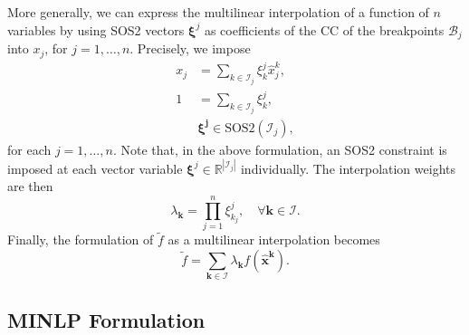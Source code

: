 \documentclass[pdflatex,sn-mathphys-num]{sn-jnl}%
\newcommand{\new}[1]{#1}
\newcommand{\R}{\mathbb{R}}
\begin{document}
More generally, we can express the multilinear interpolation of a function of $n$ variables by using SOS2 vectors $\bm{\xi}^j$ as coefficients of the CC of the breakpoints $\mathcal{B}_j$ into $x_j$, for $j=1,\ldots,n$.
Precisely, we impose
\begin{equation}\label{eq:input-constraints}
\begin{aligned}
    x_{j} &= \sum_{k\in\mathcal{I}_j} \xi^j_{k} \hat{x}_{j}^{k} ,  \\
    1 &= \sum_{k\in\mathcal{I}_j} \xi^j_{k} , \\
      & \bm{\xi^j} \in \text{SOS2}(\mathcal{I}_j) 
,\end{aligned} 
\end{equation}
for each $j=1,\ldots,n$.
\new{Note that, in the above formulation, an SOS2 constraint is imposed at each vector variable $\bm{\xi}^j\in\R^{|\mathcal{I}_j|}$ individually.}
The interpolation weights are then
\begin{equation}\label{eq:interpolation-bilinears}
   \lambda_{\bm{k}} = \prod_{j=1}^{n} \xi^j_{k_j},\quad \forall\bm{k} \in \mathcal{I}
.\end{equation}
Finally, the formulation of $\widetilde{f}$ as a multilinear interpolation becomes
\begin{equation}\label{eq:mult-interp}
   \widetilde{f} = \sum_{\bm{k}\in\mathcal{I}} \lambda_{\bm{k}}  f(\hat{\bm{x}}^{\bm{k}})
.
\end{equation}

\subsection{MINLP \new{Formulation}}
\end{document}
